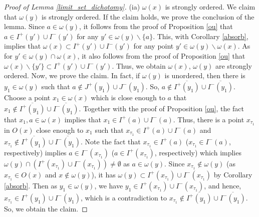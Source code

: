 \documentclass[a4paper,11pt]{article}
\theoremstyle{plain}
\theoremstyle{definition}
\numberwithin{equation}{section}
\begin{document}
\begin{proof}[Proof of Lemma \ref{limit_set_dichotomy}]
    (ia) $\omega(x)$ is strongly ordered. We claim that $\omega(y)$ is strongly ordered. If the claim holds, we prove the conclusion of the lemma. Since $a\in \omega(y)$, it follows from the proof of Proposition \ref{ou} that $a\in I^{+}(y')\cup I^{-}(y')$ for any $y'\in \omega(y)\backslash\{a\}$. 
    This, with Corollary \ref{absorb}, implies that $\omega(x)\subset I^{+}(y')\cup I^{-}(y')$ for any point $y'\in \omega(y)\backslash\omega(x)$. 
    As for $y'\in \omega(y)\cap\omega(x)$, it also follows from the proof of Proposition \ref{ou} that $\omega(x)\backslash \{y'\}\subset I^{+}(y')\cup I^{-}(y')$. 
    Thus, we obtain $\omega(x)$, $\omega(y)$ are strongly ordered. Now, we prove the claim. 
    In fact, if $\omega(y)$ is unordered, then there is $y_1\in \omega(y)$ such that $a\notin J^{+}(y_1)\cup J^{-}(y_1)$. So, $a\notin \overline{I^{+}(y_1)}\cup \overline{I^{-}(y_1)}$.
    Choose a point $x_1\in \omega(x)$ which is close enough to $a$ that $x_1\notin\overline{I^{+}(y_1)}\cup \overline{I^{-}(y_1)}$. 
    Together with the proof of Proposition \ref{ou}, the fact that $x_1,a\in \omega(x)$ implies that $x_1\in I^{+}(a)\cup I^{-}(a)$. 
    Thus, there is a point $x_{\tau_1}$ in $O(x)$ close enough to $x_1$ such that $x_{\tau_1}\in I^{+}(a)\cup I^{-}(a)$ and $x_{\tau_1}\notin\overline{I^{+}(y_1)}\cup \overline{I^{-}(y_1)}$. Note the fact that $x_{\tau_1}\in I^{+}(a)$ ($x_{\tau_1}\in I^{-}(a)$, respectively) implies $a\in I^{-}(x_{\tau_1})$ ($a\in I^{+}(x_{\tau_1})$, respectively) which implies $\omega(y)\cap (I^{+}(x_{\tau_1})\cup I^{-}(x_{\tau_1})) \neq\emptyset$ as $a\in \omega(y)$. Since $x_{\tau_1}\notin\omega(y)$ (as $x_{\tau_1}\in O(x)$ and $x\notin\omega(y)$), it has $\omega(y)\subset I^{+}(x_{\tau_1})\cup I^{-}(x_{\tau_1})$ by Corollary \ref{absorb}. 
    Then as $y_1\in \omega(y)$, we have $y_1\in I^{+}(x_{\tau_1})\cup I^{-}(x_{\tau_1})$, and hence, $x_{\tau_1}\in I^{+}(y_1)\cup I^{-}(y_1)$, which is a contradiction to $x_{\tau_1}\notin\overline{I^{+}(y_1)}\cup \overline{I^{-}(y_1)}$. So, we obtain the claim.
    

\end{proof}
\end{document}

